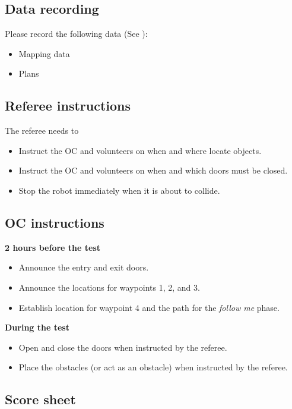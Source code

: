 \subsection{Data recording}
  Please record the following data (See ):
  \begin{itemize}
   \item Mapping data
   \item Plans
  \end{itemize}

\subsection{Referee instructions}

The referee needs to
\begin{itemize}
	\item Instruct the OC and volunteers on when and where locate objects.
	\item Instruct the OC and volunteers on when and which doors must be closed.
	\item Stop the robot immediately when it is about to collide.
\end{itemize}

\subsection{OC instructions}

\textbf{2 hours before the test}
\begin{itemize}
        \item Announce the entry and exit doors. 
	\item Announce the locations for waypoints 1, 2, and 3.
	\item Establish location for waypoint 4 and the path for the \textit{follow me} phase. 
\end{itemize}

\textbf{During the test}
\begin{itemize}
	\item Open and close the doors when instructed by the referee.
	\item Place the obstacles (or act as an obstacle) when instructed by the referee.
\end{itemize}

\newpage

\subsection{Score sheet}


